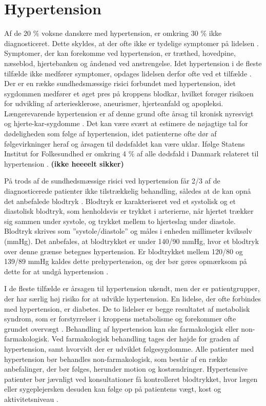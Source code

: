 \section{Hypertension}

Af de 20 \% voksne danskere med hypertension, er omkring 30 \% ikke diagnosticeret. Dette skyldes, at der ofte ikke er tydelige symptomer på lidelsen \cite{kronborg2008}. Symptomer, der kan forekomme ved hypertension, er træthed, hovedpine, næseblod, hjertebanken og åndenød ved anstrengelse. Idet hypertension i de fleste tilfælde ikke medfører symptomer, opdages lidelsen derfor ofte ved et tilfælde \cite{olsen2015}.
Der er en række sundhedsmæssige risici forbundet med hypertension, idet sygdommen medfører et øget pres på kroppens blodkar, hvilket forøger risikoen for udvikling af arteriesklerose, aneurismer, hjerteanfald og apopleksi. Længerevarende hypertension er af denne grund ofte årsag til kronisk nyresvigt og hjerte-kar-sygdomme \cite{martini2015}. Det kan være svært at estimere de nøjagtige tal for dødeligheden som følge af hypertension, idet patienterne ofte dør af følgevirkninger heraf og årsagen til dødsfaldet kan være uklar. Ifølge Statens Institut for Folkesundhed er omkring 4 \% af alle dødsfald i Danmark relateret til hypertension \cite{juel2006}. \textbf{(ikke heeeelt sikker)}
 
På trods af de sundhedsmæssige risici ved hypertension får 2/3 af de diagnosticerede patienter ikke tilstrækkelig behandling, således at de kan opnå det anbefalede blodtryk \cite{paulsen2012}.
Blodtryk er karakteriseret ved et systolisk og et diastolisk blodtryk, som henholdsvis er trykket i arterierne, når hjertet trækker sig sammen under systole, og trykket mellem to hjerteslag under diastole. Blodtryk skrives som ”systole/diastole” og måles i enheden millimeter kviksølv (mmHg). Det anbefales, at blodtrykket er under 140/90 mmHg, hvor et blodtryk over denne grænse betegnes hypertension. Er blodtrykket mellem 120/80 og 139/89 mmHg kaldes dette prehypertension, og der bør gøres opmærksom på dette for at undgå hypertension \cite{martini2015}.

I de fleste tilfælde er årsagen til hypertension ukendt, men der er patientgrupper, der har særlig høj risiko for at udvikle hypertension. En lidelse, der ofte forbindes med hypertension, er diabetes. De to lidelser er begge resultatet af metabolisk syndrom, som er forstyrrelser i kroppens metabolisme og forekommer ofte grundet overvægt \cite{cheung2012}.
Behandling af hypertension kan ske farmakologisk eller non-farmakologisk. Ved farmakologisk behandling tages der højde for graden af hypertension, samt hvorvidt der er udviklet følgesygdomme. Alle patienter med hypertension bør behandles non-farmakologisk, som består af en række anbefalinger, der bør følges, herunder motion og kostændringer. Hypertensive patienter bør jævnligt ved konsultationer få kontrolleret blodtrykket, hvor lægen eller sygeplejersken desuden kan følge op på patientens vægt, kost og aktivitetsniveau \cite{lodberg2016}.
